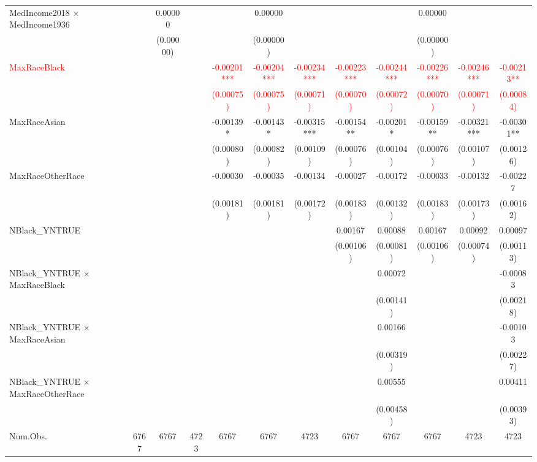 \documentclass[
]{article}
\begin{document}
\begin{table}
{\begin{tabular}[t]{lccccccccccc}
MedIncome2018 × MedIncome1936 &  & 0.00000 &  &  & 0.00000 &  &  &  & 0.00000 &  & \\
 &  & (0.00000) &  &  & (0.00000) &  &  &  & (0.00000) &  & \\
\textcolor{red}{MaxRaceBlack} & \textcolor{red}{} & \textcolor{red}{} & \textcolor{red}{} & \textcolor{red}{-0.00201***} & \textcolor{red}{-0.00204***} & \textcolor{red}{-0.00234***} & \textcolor{red}{-0.00223***} & \textcolor{red}{-0.00244***} & \textcolor{red}{-0.00226***} & \textcolor{red}{-0.00246***} & \textcolor{red}{-0.00213**}\\
\textcolor{red}{} & \textcolor{red}{} & \textcolor{red}{} & \textcolor{red}{} & \textcolor{red}{(0.00075)} & \textcolor{red}{(0.00075)} & \textcolor{red}{(0.00071)} & \textcolor{red}{(0.00070)} & \textcolor{red}{(0.00072)} & \textcolor{red}{(0.00070)} & \textcolor{red}{(0.00071)} & \textcolor{red}{(0.00084)}\\
MaxRaceAsian &  &  &  & -0.00139* & -0.00143* & -0.00315*** & -0.00154** & -0.00201* & -0.00159** & -0.00321*** & -0.00301**\\
 &  &  &  & (0.00080) & (0.00082) & (0.00109) & (0.00076) & (0.00104) & (0.00076) & (0.00107) & (0.00126)\\
MaxRaceOtherRace &  &  &  & -0.00030 & -0.00035 & -0.00134 & -0.00027 & -0.00172 & -0.00033 & -0.00132 & -0.00227\\
 &  &  &  & (0.00181) & (0.00181) & (0.00172) & (0.00183) & (0.00132) & (0.00183) & (0.00173) & (0.00162)\\
NBlack\_YNTRUE &  &  &  &  &  &  & 0.00167 & 0.00088 & 0.00167 & 0.00092 & 0.00097\\
 &  &  &  &  &  &  & (0.00106) & (0.00081) & (0.00106) & (0.00074) & (0.00113)\\
NBlack\_YNTRUE × MaxRaceBlack &  &  &  &  &  &  &  & 0.00072 &  &  & -0.00083\\
 &  &  &  &  &  &  &  & (0.00141) &  &  & (0.00218)\\
NBlack\_YNTRUE × MaxRaceAsian &  &  &  &  &  &  &  & 0.00166 &  &  & -0.00103\\
 &  &  &  &  &  &  &  & (0.00319) &  &  & (0.00227)\\
NBlack\_YNTRUE × MaxRaceOtherRace &  &  &  &  &  &  &  & 0.00555 &  &  & 0.00411\\
 &  &  &  &  &  &  &  & (0.00458) &  &  & (0.00393)\\
\midrule
Num.Obs. & 6767 & 6767 & 4723 & 6767 & 6767 & 4723 & 6767 & 6767 & 6767 & 4723 & 4723\\

\end{tabular}}
\end{table}
\end{document}
